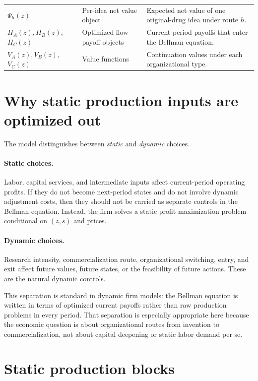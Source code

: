 \documentclass[12pt,fontset=none]{ctexart}
\begin{document}
\begin{longtable}{@{}P{0.19\textwidth}P{0.21\textwidth}P{0.52\textwidth}@{}}
$\Psi_h(z)$ & Per-idea net value object & Expected net value of one original-drug idea under route $h$. \\[0.4em]

$\Pi_A(z),\Pi_B(z),$\newline$\Pi_C(z)$ & Optimized flow payoff objects & Current-period payoffs that enter the Bellman equation. \\[0.4em]

$V_A(z),V_B(z),$\newline$V_C(z)$ & Value functions & Continuation values under each organizational type. \\

\bottomrule
\end{longtable}

\section{Why static production inputs are optimized out}

The model distinguishes between \emph{static} and \emph{dynamic} choices.

\paragraph{Static choices.}
Labor, capital services, and intermediate inputs affect current-period operating profits.
If they do not become next-period states and do not involve dynamic adjustment costs, then
they should not be carried as separate controls in the Bellman equation. Instead, the firm
solves a static profit maximization problem conditional on $(z,s)$ and prices.

\paragraph{Dynamic choices.}
Research intensity, commercialization route, organizational switching, entry, and exit affect
future values, future states, or the feasibility of future actions. These are the natural
dynamic controls.

This separation is standard in dynamic firm models: the Bellman equation is written in
terms of optimized current payoffs rather than raw production problems in every period.
That separation is especially appropriate here because the economic question is about
organizational routes from invention to commercialization, not about capital deepening
or static labor demand per se.

\section{Static production blocks}
\end{document}
